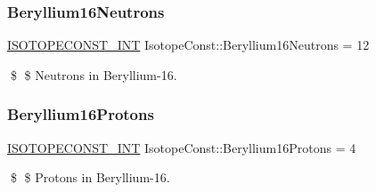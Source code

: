 \subsubsection{\texorpdfstring{Beryllium16\+Neutrons}{Beryllium16Neutrons}}
{\footnotesize\ttfamily \mbox{\hyperlink{group___isotope_const-_macros_ga5f18360b3e99483a35c32d789e62621c}{I\+S\+O\+T\+O\+P\+E\+C\+O\+N\+S\+T\+\_\+\+I\+NT}} Isotope\+Const\+::\+Beryllium16\+Neutrons = 12}

\$ \$ Neutrons in Beryllium-\/16. \mbox{\label{group___isotope_const-_beryllium-_be16_ga5021d23e3152fedc707384019f979b56}} 
\subsubsection{\texorpdfstring{Beryllium16\+Protons}{Beryllium16Protons}}
{\footnotesize\ttfamily \mbox{\hyperlink{group___isotope_const-_macros_ga5f18360b3e99483a35c32d789e62621c}{I\+S\+O\+T\+O\+P\+E\+C\+O\+N\+S\+T\+\_\+\+I\+NT}} Isotope\+Const\+::\+Beryllium16\+Protons = 4}

\$ \$ Protons in Beryllium-\/16. 